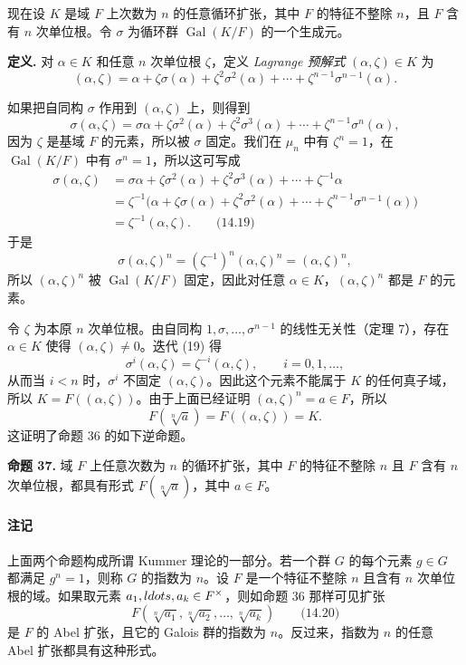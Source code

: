 现在设 $K$ 是域 $F$ 上次数为 $n$ 的任意循环扩张，其中 $F$ 的特征不整除 $n$，且 $F$ 含有 $n$ 次单位根。令 $\sigma$ 为循环群 $\operatorname{Gal}(K/F)$ 的一个生成元。

\noindent\textbf{定义.} 对 $\alpha\in K$ 和任意 $n$ 次单位根 $\zeta$，定义 \emph{Lagrange 预解式} $(\alpha,\zeta)\in K$ 为
\[
(\alpha,\zeta)=\alpha+\zeta\sigma(\alpha)+\zeta^2\sigma^2(\alpha)+\cdots+\zeta^{n-1}\sigma^{n-1}(\alpha).
\]

如果把自同构 $\sigma$ 作用到 $(\alpha,\zeta)$ 上，则得到
\[
\sigma(\alpha,\zeta)=\sigma\alpha+\zeta\sigma^2(\alpha)+\zeta^2\sigma^3(\alpha)+\cdots+\zeta^{n-1}\sigma^n(\alpha),
\]
因为 $\zeta$ 是基域 $F$ 的元素，所以被 $\sigma$ 固定。我们在 $\mu_n$ 中有 $\zeta^n=1$，在 $\operatorname{Gal}(K/F)$ 中有 $\sigma^n=1$，所以这可写成
\[
\begin{aligned}
\sigma(\alpha,\zeta)
&=\sigma\alpha+\zeta\sigma^2(\alpha)+\zeta^2\sigma^3(\alpha)+\cdots+\zeta^{-1}\alpha\\
&=\zeta^{-1}\bigl(\alpha+\zeta\sigma(\alpha)+\zeta^2\sigma^2(\alpha)+\cdots+\zeta^{n-1}\sigma^{n-1}(\alpha)\bigr)\\
&=\zeta^{-1}(\alpha,\zeta). \qquad\text{(14.19)}
\end{aligned}
\]
于是
\[
\sigma(\alpha,\zeta)^n=(\zeta^{-1})^n(\alpha,\zeta)^n=(\alpha,\zeta)^n,
\]
所以 $(\alpha,\zeta)^n$ 被 $\operatorname{Gal}(K/F)$ 固定，因此对任意 $\alpha\in K$，$(\alpha,\zeta)^n$ 都是 $F$ 的元素。

令 $\zeta$ 为本原 $n$ 次单位根。由自同构 $1,\sigma,\ldots,\sigma^{n-1}$ 的线性无关性（定理 7），存在 $\alpha\in K$ 使得 $(\alpha,\zeta)\neq 0$。迭代 (19) 得
\[
\sigma^i(\alpha,\zeta)=\zeta^{-i}(\alpha,\zeta),\qquad i=0,1,\ldots,
\]
从而当 $i<n$ 时，$\sigma^i$ 不固定 $(\alpha,\zeta)$。因此这个元素不能属于 $K$ 的任何真子域，所以 $K=F((\alpha,\zeta))$。由于上面已经证明 $(\alpha,\zeta)^n=a\in F$，所以
\[
F(\sqrt[n]{a})=F((\alpha,\zeta))=K.
\]
这证明了命题 36 的如下逆命题。

\noindent\textbf{命题 37.} 域 $F$ 上任意次数为 $n$ 的循环扩张，其中 $F$ 的特征不整除 $n$ 且 $F$ 含有 $n$ 次单位根，都具有形式 $F(\sqrt[n]{a})$，其中 $a\in F$。

\paragraph{注记}
上面两个命题构成所谓 Kummer 理论的一部分。若一个群 $G$ 的每个元素 $g\in G$ 都满足 $g^n=1$，则称 $G$ 的指数为 $n$。设 $F$ 是一个特征不整除 $n$ 且含有 $n$ 次单位根的域。如果取元素 $a_1,\\ldots,a_k\in F^\times$，则如命题 36 那样可见扩张
\[
F(\sqrt[n]{a_1},\sqrt[n]{a_2},\ldots,\sqrt[n]{a_k}) \qquad\text{(14.20)}
\]
是 $F$ 的 Abel 扩张，且它的 Galois 群的指数为 $n$。反过来，指数为 $n$ 的任意 Abel 扩张都具有这种形式。

